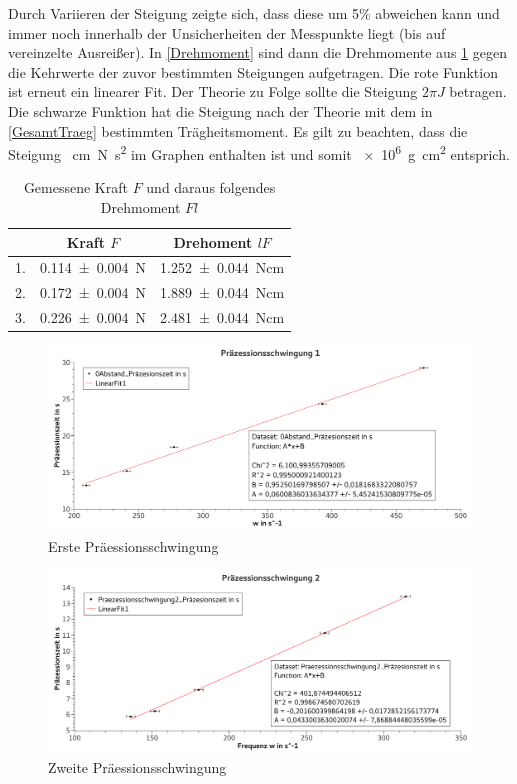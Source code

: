 \documentclass[
	a4paper,
	12pt,
	pagesize,
	ngerman
]{scrartcl}
\begin{document}
	Durch Variieren der Steigung zeigte sich, dass diese um 5\% abweichen kann und immer noch innerhalb der Unsicherheiten der Messpunkte liegt (bis auf vereinzelte Ausreißer).
	In \cref{Drehmoment} sind dann die Drehmomente aus \cref{Tabelle_Kraft} gegen die Kehrwerte der zuvor bestimmten Steigungen aufgetragen. 
	Die rote Funktion ist erneut ein linearer Fit. 
	Der Theorie zu Folge sollte die Steigung $2\pi J$ betragen. 
	Die schwarze Funktion hat die Steigung nach der Theorie mit dem in \cref{GesamtTraeg} bestimmten Trägheitsmoment.
	Es gilt zu beachten, dass die Steigung \SI{}{cm N s^2} im Graphen enthalten ist und somit \SI{e6}{g cm^2} entsprich.

	\begin{table}[tb]
		\centering
		\begin{tabular}{ r | c | c}
			& Kraft $F$ & Drehoment $lF$\\ \hline
			1.& \SI{0,114 \pm 0,004 }{N}& \SI{1,252 \pm 0,044}{Ncm} \\
			2.& \SI{0,172 \pm 0,004 }{N}& \SI{1,889 \pm 0,044}{Ncm} \\
			3.& \SI{0,226 \pm 0,004 }{N}& \SI{2,481 \pm 0,044}{Ncm} \\
		\end{tabular}
		\caption{Gemessene Kraft $F$ und daraus folgendes Drehmoment $Fl$}
		\label{Tabelle_Kraft} 
	\end{table}

	\begin{figure}[tb]
		\includegraphics[width=1\textwidth]{Praez1}
		\centering
		\caption{Erste Präessionsschwingung} %
		\label{Praez1}
		\centering
	\end{figure}

	\begin{figure}[tb]
		\includegraphics[width=1\textwidth]{Praez2}
		\centering
		\caption{Zweite Präessionsschwingung}
		\label{Praez2}
		\centering
	\end{figure}
\end{document}
